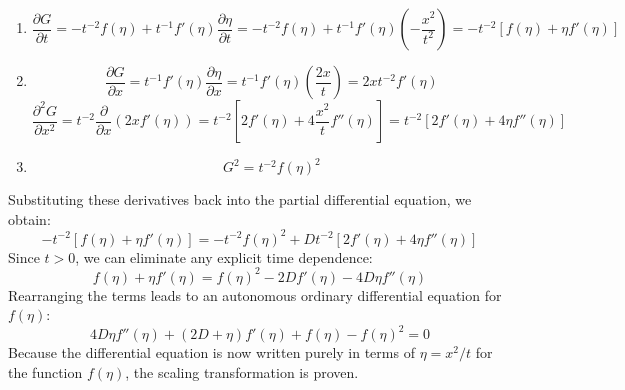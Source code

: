 \documentclass{article}
\begin{document}
\begin{enumerate}
    \item
    \begin{equation}
        \frac{\partial G}{\partial t} = -t^{-2} f(\eta) + t^{-1} f'(\eta) \frac{\partial \eta}{\partial t} = -t^{-2} f(\eta) + t^{-1} f'(\eta) \left( -\frac{x^2}{t^2} \right) = -t^{-2} \left[ f(\eta) + \eta f'(\eta) \right]
    \end{equation}

    \item
    \begin{equation}
        \frac{\partial G}{\partial x} = t^{-1} f'(\eta) \frac{\partial \eta}{\partial x} = t^{-1} f'(\eta) \left( \frac{2x}{t} \right) = 2x t^{-2} f'(\eta)
    \end{equation}
    \begin{equation}
        \frac{\partial^2 G}{\partial x^2} = t^{-2} \frac{\partial}{\partial x} \left( 2x f'(\eta) \right) = t^{-2} \left[ 2 f'(\eta) + 4\frac{x^2}{t} f''(\eta) \right] = t^{-2} \left[ 2 f'(\eta) + 4\eta f''(\eta) \right]
    \end{equation}

    \item
    \begin{equation}
        G^2 = t^{-2} f(\eta)^2
    \end{equation}
\end{enumerate}

Substituting these derivatives back into the partial differential equation, we obtain:
\begin{equation}
    -t^{-2} \left[ f(\eta) + \eta f'(\eta) \right] = -t^{-2} f(\eta)^2 + D t^{-2} \left[ 2 f'(\eta) + 4\eta f''(\eta) \right]
\end{equation}
Since $t > 0$, we can eliminate any explicit time dependence:
\begin{equation}
    f(\eta) + \eta f'(\eta) = f(\eta)^2 - 2D f'(\eta) - 4D\eta f''(\eta)
\end{equation}
Rearranging the terms leads to an autonomous ordinary differential equation for $f(\eta)$:
\begin{equation}
    4D\eta f''(\eta) + (2D + \eta) f'(\eta) + f(\eta) - f(\eta)^2 = 0
\end{equation}
Because the differential equation is now written purely in terms of $\eta = x^2/t$ for the function $f(\eta)$, the scaling transformation is proven.
\end{document}

